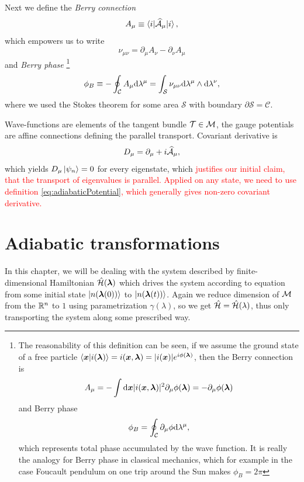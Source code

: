 Next we define the \emph{Berry connection}
\begin{equation}
    A_\mu\equiv \braket{i|\AA_\mu|i},
\end{equation}
which empowers us to write
\begin{equation}
    \nu_{\mu\nu} = \partial_\mu A_\nu-\partial_\nu A_\mu
\end{equation}
and \emph{Berry phase}
    \footnote{
        The reasonability of this definition can be seen, if we assume the ground state of a free particle
            $\braket{\bm{x}|i(\llambda)}=i(\bm{x},\llambda)= |i(\bm{x})|e^{i\phi(\llambda)}$,
        then the Berry connection is
        \begin{equation}
            A_\mu=-\int \d \bm{x}|i(\bm{x},\llambda)|^2\partial_\mu \phi(\llambda) = -\partial_\mu \phi(\llambda)
        \end{equation} 
        and Berry phase
        \begin{equation}
            \phi_B=\oint_\mathcal{C} \partial_\mu \phi \d \lambda^\mu,
        \end{equation}
        which represents total phase accumulated by the wave function. It is really the analogy for Berry phase in classical mechanics, which for example in the case Foucault pendulum on one trip around the Sun makes $\phi_B=2\pi$
    }
\begin{equation}
    \phi_B\equiv-\oint_\mathcal{C} A_\mu \d \lambda^\mu=\int_\mathcal{S} \nu_{\mu\nu}\d \lambda^\mu \wedge \d\lambda^\nu,
\end{equation}
where we used the Stokes theorem for some area $\mathcal{S}$ with boundary $\partial\mathcal{S}=\mathcal{C}$.

Wave-functions are elements of the tangent bundle $\TT\in \M$, the gauge potentials are affine connections defining the parallel transport. Covariant derivative is
\begin{equation}
    D_\mu=\partial_\mu+i\AA_\mu,
\end{equation}
which yields $D_\mu\ket{\psi_n}=0$ for every eigenstate, which \textcolor{red}{justifies our initial claim, that the transport of eigenvalues is parallel. Applied on any state, we need to use definition \ref{eq:adiabaticPotential}, which generally gives non-zero covariant derivative.}




\section{Adiabatic transformations}
In this chapter, we will be dealing with the system described by finite-dimensional Hamiltonian $\HH(\llambda)$ which drives the system according to \Schrodinger equation from some initial state $\ket{n(\llambda(0))}$ to $\ket{n(\llambda(t))}$. Again we reduce dimension of $\M$ from the $\R^n$ to $1$ using parametrization $\gamma(\lambda)$, so we get $\HH=\HH(\lambda)$, thus only transporting the system along some prescribed way.

